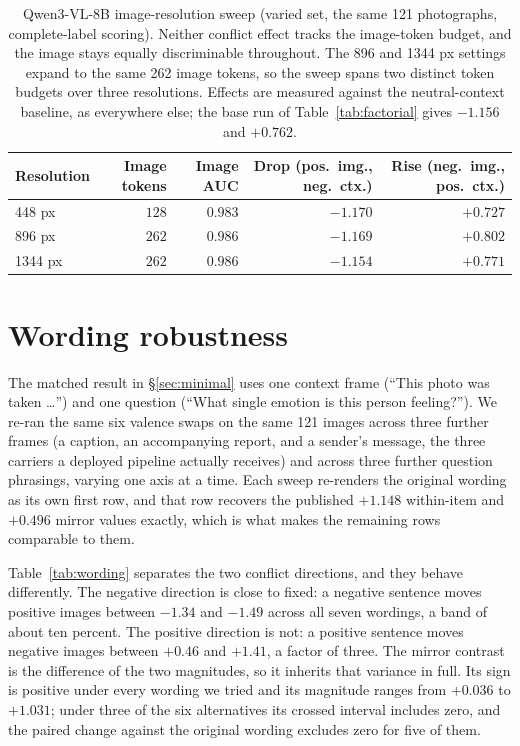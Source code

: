 \documentclass{article}
\newif\ifshort
\newcommand{\qwen}{Qwen3-VL-8B}
\begin{document}
\begin{table}[h]
\caption{\qwen{} image-resolution sweep (varied set, the same 121 photographs, complete-label scoring). Neither conflict effect tracks the image-token budget, and the image stays equally discriminable throughout. The 896 and 1344 px settings expand to the same 262 image tokens, so the sweep spans two distinct token budgets over three resolutions. Effects are measured against the neutral-context baseline, as everywhere else; the base run of Table~\ref{tab:factorial} gives $-1.156$ and $+0.762$.}
\label{tab:resolution}
\centering
\small
\begin{tabular}{lrrrr}
\toprule
Resolution & Image tokens & Image AUC & Drop (pos.\ img., neg.\ ctx.) & Rise (neg.\ img., pos.\ ctx.) \\
\midrule
448 px  & $128$ & $0.983$ & $-1.170$ & $+0.727$ \\
896 px  & $262$ & $0.986$ & $-1.169$ & $+0.802$ \\
1344 px & $262$ & $0.986$ & $-1.154$ & $+0.771$ \\
\bottomrule
\end{tabular}
\end{table}


\ifshort\else
\section{Wording robustness}
\label{app:wording}

The matched result in \S\ref{sec:minimal} uses one context frame (``This photo was taken \ldots'') and one question (``What single emotion is this person feeling?''). We re-ran the same six valence swaps on the same 121 images across three further frames (a caption, an accompanying report, and a sender's message, the three carriers a deployed pipeline actually receives) and across three further question phrasings, varying one axis at a time. Each sweep re-renders the original wording as its own first row, and that row recovers the published $+1.148$ within-item and $+0.496$ mirror values exactly, which is what makes the remaining rows comparable to them.

Table~\ref{tab:wording} separates the two conflict directions, and they behave differently. The negative direction is close to fixed: a negative sentence moves positive images between $-1.34$ and $-1.49$ across all seven wordings, a band of about ten percent. The positive direction is not: a positive sentence moves negative images between $+0.46$ and $+1.41$, a factor of three. The mirror contrast is the difference of the two magnitudes, so it inherits that variance in full. Its sign is positive under every wording we tried and its magnitude ranges from $+0.036$ to $+1.031$; under three of the six alternatives its crossed interval includes zero, and the paired change against the original wording excludes zero for five of them.
\end{document}
